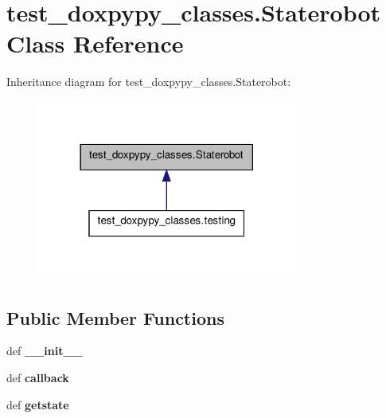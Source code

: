 \hypertarget{classtest__doxpypy__classes_1_1Staterobot}{\section{test\+\_\+doxpypy\+\_\+classes.\+Staterobot Class Reference}
\label{classtest__doxpypy__classes_1_1Staterobot}
}


Inheritance diagram for test\+\_\+doxpypy\+\_\+classes.\+Staterobot\+:\nopagebreak
\begin{figure}[H]
\begin{center}
\leavevmode
\includegraphics[width=242pt]{classtest__doxpypy__classes_1_1Staterobot__inherit__graph}
\end{center}
\end{figure}
\subsection*{Public Member Functions}
\begin{DoxyCompactItemize}
\item 
\hypertarget{classtest__doxpypy__classes_1_1Staterobot_a77ca2336c1acac943d30afb859102361}{def {\bfseries \+\_\+\+\_\+init\+\_\+\+\_\+}}\label{classtest__doxpypy__classes_1_1Staterobot_a77ca2336c1acac943d30afb859102361}

\item 
\hypertarget{classtest__doxpypy__classes_1_1Staterobot_a89f48952cbb1d371c801caf795387879}{def {\bfseries callback}}\label{classtest__doxpypy__classes_1_1Staterobot_a89f48952cbb1d371c801caf795387879}

\item 
\hypertarget{classtest__doxpypy__classes_1_1Staterobot_a7fe83f63ee911c5b5afd05a34dc8da62}{def {\bfseries getstate}}\label{classtest__doxpypy__classes_1_1Staterobot_a7fe83f63ee911c5b5afd05a34dc8da62}

\end{DoxyCompactItemize}

